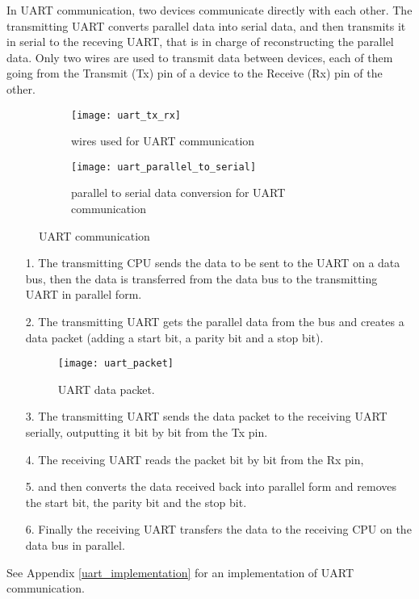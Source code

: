 In UART communication, two devices communicate directly with each other. The transmitting UART converts parallel data into serial data, and then transmits it in serial to the receving UART, that is in charge of reconstructing the parallel data. Only two wires are used to transmit data between devices, each of them going from the Transmit (Tx) pin of a device to the Receive (Rx) pin of the other.

\begin{figure}[htb]
 \centering
	\begin{subfigure}{0.35\textwidth}
		\texttt{[image: uart\_tx\_rx]}
		\captionsetup{justification=centering}
		\caption{wires used for UART communication}
	\end{subfigure}\hfil
	\begin{subfigure}{0.6\textwidth}
		\texttt{[image: uart\_parallel\_to\_serial]}
		\captionsetup{justification=centering}
		\caption{parallel to serial data conversion for UART communication}
	\end{subfigure}
	\captionsetup{justification=centering, margin=1.5cm}
	\centering
	\caption{UART communication}
\end{figure}

\begin{itemize}
	\item[1. ] The transmitting CPU sends the data to be sent to the UART on a data bus, then the data is transferred from the data bus to the transmitting UART in parallel form.
	\item[2. ] The transmitting UART gets the parallel data from the bus and creates a data packet (adding a start bit, a parity bit and a stop bit).
					\begin{figure}[!ht]
						\texttt{[image: uart\_packet]}
						\captionsetup{justification=centering, margin=1.5cm}
						\centering
						\caption{UART data packet.}
						\centering
					\end{figure}
	\item[3. ] The transmitting UART sends the data packet to the receiving UART serially, outputting it bit by bit from the Tx pin.
	\item[4. ] The receiving UART reads the packet bit by bit from the Rx pin,
	\item[5. ] and then converts the data received back into parallel form and removes the start bit, the parity bit and the stop bit.
	\item[6. ] Finally the receiving UART transfers the data to the receiving CPU on the data bus in parallel.
\end{itemize}
See Appendix \ref{uart_implementation} for an implementation of UART communication.\\

